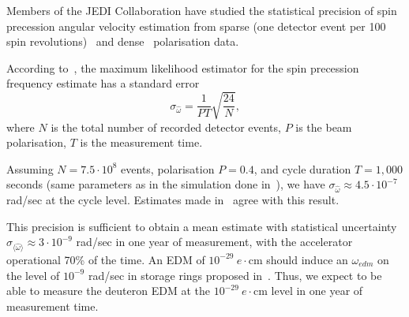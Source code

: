 \documentclass[]{elsarticle}
\newcommand{\w}{\omega}
\newcommand{\avg}[1]{\langle{#1}\rangle}
\newcommand{\wedm}{\w_{edm}}
\begin{document}
Members of the JEDI Collaboration have studied the statistical precision of spin precession angular velocity 
estimation from sparse (one detector event per 100 spin revolutions)~\cite{Pretz:Stats:Sparse} and 
dense~\cite{Aksentev:Stats} polarisation data.

According to~\cite{Pretz:Stats:Sparse}, the maximum likelihood estimator for the spin precession frequency
estimate has a standard error 
\[
  \sigma_{\hat\w} = \frac{1}{PT}\sqrt{\frac{24}{N}},
\]
where $N$ is the total number of recorded detector events, $P$ is the beam polarisation, $T$ is the 
measurement time. 

Assuming $N=7.5\cdot 10^8$ events, polarisation $P=0.4$, and cycle duration
$T=1,000$ seconds (same parameters as in the simulation done in~\cite{Aksentev:Stats}),
we have $\sigma_{\hat\w} \approx 4.5\cdot 10^{-7}$ rad/sec at the cycle level. 
Estimates made in~\cite{Aksentev:Stats} agree with this result. 

This precision is sufficient to obtain a mean estimate with statistical uncertainty
$\sigma_{\avg{\hat\w}} \approx 3\cdot 10^{-9}$ rad/sec in one year of measurement, with
the accelerator operational 70\% of the time. An EDM of $10^{-29}~e\cdot$cm should 
induce an $\wedm$ on the level of $10^{-9}$ rad/sec in storage rings proposed 
in~\cite{Senichev:Lattices}. Thus, we expect to be able to measure the deuteron EDM
at the $10^{-29}~e\cdot$cm level in one year of measurement time.
\end{document}

